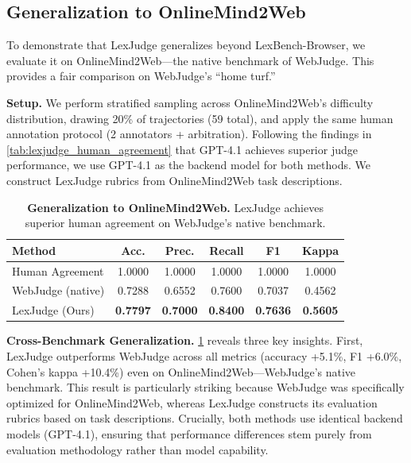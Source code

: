 \subsection{Generalization to OnlineMind2Web}
\label{app:generalization}

To demonstrate that LexJudge generalizes beyond LexBench-Browser, we evaluate it on OnlineMind2Web---the native benchmark of WebJudge. This provides a fair comparison on WebJudge's ``home turf.''

\textbf{Setup.} We perform stratified sampling across OnlineMind2Web's difficulty distribution, drawing 20\% of trajectories (59 total), and apply the same human annotation protocol (2 annotators + arbitration). Following the findings in \cref{tab:lexjudge_human_agreement} that GPT-4.1 achieves superior judge performance, we use GPT-4.1 as the backend model for both methods. We construct LexJudge rubrics from OnlineMind2Web task descriptions.

\begin{table}[h]
\centering
\caption{\textbf{Generalization to OnlineMind2Web.} LexJudge achieves superior human agreement on WebJudge's native benchmark.}
\label{tab:lexjudge_generalization_omw}
\small
\begin{tabular}{@{}lccccc@{}}
\toprule
\textbf{Method} & \textbf{Acc.} & \textbf{Prec.} & \textbf{Recall} & \textbf{F1} & \textbf{Kappa} \\
\midrule
Human Agreement & 1.0000 & 1.0000 & 1.0000 & 1.0000 & 1.0000 \\
\midrule
WebJudge (native) & 0.7288 & 0.6552 & 0.7600 & 0.7037 & 0.4562 \\
LexJudge (Ours) & \textbf{0.7797} & \textbf{0.7000} & \textbf{0.8400} & \textbf{0.7636} & \textbf{0.5605} \\
\bottomrule
\end{tabular}
\end{table}

\textbf{Cross-Benchmark Generalization.}
\cref{tab:lexjudge_generalization_omw} reveals three key insights. First, LexJudge outperforms WebJudge across all metrics (accuracy +5.1\%, F1 +6.0\%, Cohen's kappa +10.4\%) even on OnlineMind2Web---WebJudge's native benchmark. This result is particularly striking because WebJudge was specifically optimized for OnlineMind2Web, whereas LexJudge constructs its evaluation rubrics based on task descriptions. Crucially, both methods use identical backend models (GPT-4.1), ensuring that performance differences stem purely from evaluation methodology rather than model capability.

